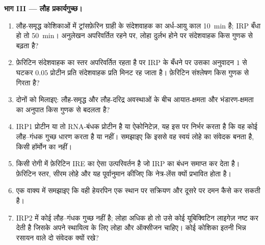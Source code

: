\begin{problem}
\medskip
\noindent\textbf{भाग III --- लौह प्रकार्यगुच्छ।}
\begin{enumerate}[resume]
  \item लौह-समृद्ध कोशिकाओं में ट्रांसफ़ेरिन ग्राही के संदेशवाहक का
        अर्ध-आयु काल \qty{10}{min} है; IRP बँधा हो तो \qty{50}{min}।
        अनुलेखन अपरिवर्तित रहने पर, लोहा दुर्लभ होने पर संदेशवाहक किस
        गुणक से बढ़ता है?
  \item फ़ेरिटिन संदेशवाहक का स्तर अपरिवर्तित रहता है पर IRP के बँधने
        पर उसका अनुवादन $1$ से घटकर $0.05$ प्रोटीन प्रति संदेशवाहक
        प्रति मिनट रह जाता है। फ़ेरिटिन संश्लेषण किस गुणक से गिरता है?
  \item दोनों को मिलाइए: लौह-समृद्ध और लौह-दरिद्र अवस्थाओं के बीच
        आयात-क्षमता और भंडारण-क्षमता का अनुपात किस गुणक से बदलता है?
  \item IRP1 प्रोटीन या तो RNA-बंधक प्रोटीन है या ऐकोनिटेज़, यह इस पर
        निर्भर करता है कि वह कोई लौह--गंधक गुच्छ धारण करता है या नहीं।
        समझाइए कि इससे वह स्वयं लोहे का संवेदक बनता है, किसी हॉर्मोन
        का नहीं।
  \item किसी रोगी में फ़ेरिटिन IRE का ऐसा उत्परिवर्तन है जो IRP का
        बंधन समाप्त कर देता है। फ़ेरिटिन स्तर, सीरम लोहे और यह
        पूर्वानुमान कीजिए कि नेत्र-लेंस क्यों प्रभावित होता है।
  \item एक वाक्य में समझाइए कि वही हेयरपिन एक स्थान पर सक्रियण और
        दूसरे पर दमन कैसे कर सकती है।
  \item IRP2 में कोई लौह--गंधक गुच्छ नहीं है; लोहा अधिक हो तो उसे कोई
        यूबिक्विटिन लाइगेज़ नष्ट कर देती है जिसके अपने स्थायित्व के
        लिए लोहा और ऑक्सीजन चाहिए। कोई कोशिका इतनी भिन्न रसायन वाले
        दो संवेदक क्यों रखे?
\end{enumerate}


\end{problem}
